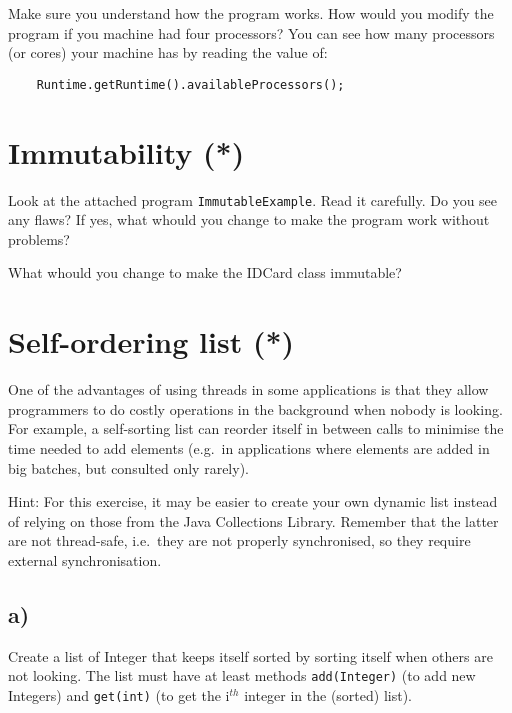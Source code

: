 \documentclass{article}
\begin{document}
Make sure you understand how the program works. How would you modify
the program if you machine had four processors? You can see how many
processors (or cores) your machine has by reading the value of: 

\begin{verbatim}
    Runtime.getRuntime().availableProcessors();
\end{verbatim}

\section{Immutability (*)}
\label{sec:immutability}

Look at the attached program \verb+ImmutableExample+. Read it
carefully. Do you see any flaws? If yes, what whould you change to
make the program work without problems?

What whould you change to make the IDCard class immutable?

\section{Self-ordering list (*)}
\label{sec:self-ordering-list}

One of the advantages of using threads in some applications is that
they allow programmers to do costly operations in the background when
nobody is looking. For example, a self-sorting list can reorder itself
in between calls to minimise the time needed to add elements (e.g.~in
applications where elements are added in big batches, but consulted
only rarely).

Hint: For this exercise, it may be easier to create your own dynamic
list instead of relying on those from the Java Collections
Library. Remember that the latter are not thread-safe, i.e.~they are
not properly synchronised, so they require external synchronisation. 

\subsection{a)}

Create a list of Integer that keeps itself sorted by sorting itself
when others are not looking. The list must have at least methods
\verb+add(Integer)+ (to add new Integers) and \verb+get(int)+ (to get
the i$^{th}$ integer in the (sorted) list). 
\end{document}
